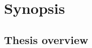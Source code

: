

	\newcommand{\relevance}{\underline{\textbf{\relevanceTXT}}}
	\newcommand{\goal}{\underline{\textbf{\goalTXT}}}
	\newcommand{\scientifictasks}{\underline{\textbf{\scientifictasksTXT}}}
	\newcommand{\scientificnovelty}{\underline{\textbf{\scientificnoveltyTXT}}}
\chapter*{Synopsis}
\section*{Thesis overview}

